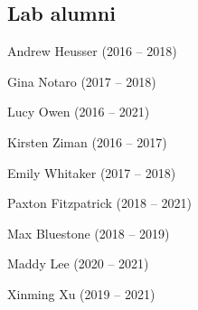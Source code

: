 \documentclass{tufte-book} %
\begin{document}
\begin{fullwidth}
\subsection{Lab alumni}
\begin{multicols}{2}\raggedcolumns
\begin{list}{\quad}{}
\item Andrew Heusser (2016 -- 2018)
\item Gina Notaro (2017 -- 2018)
\end{list}
\end{multicols}

\begin{multicols}{2}\raggedcolumns
  \begin{list}{\quad}{}
    \item Lucy Owen (2016 -- 2021)
  \end{list}
  \end{multicols}

\begin{multicols}{2}\raggedcolumns
\begin{list}{\quad}{}
\item Kirsten Ziman (2016 -- 2017)
\item Emily Whitaker (2017 -- 2018)
\item Paxton Fitzpatrick (2018 -- 2021)

\end{list}
\end{multicols}


\begin{multicols}{2}\raggedcolumns
\begin{list}{\quad}{}
\item Max Bluestone (2018 -- 2019)
\item Maddy Lee (2020 -- 2021)
\item Xinming Xu (2019 -- 2021)
\end{list}
\end{multicols}



\end{fullwidth}
\end{document}
